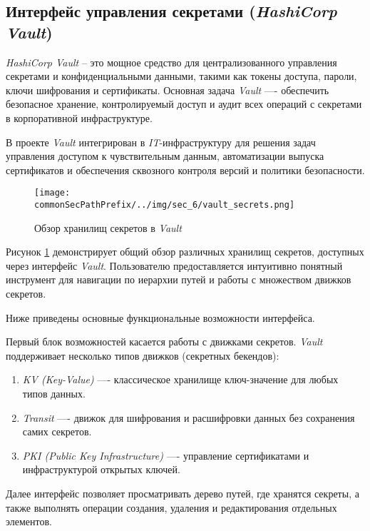\subsection{Интерфейс управления секретами (\textit{HashiCorp Vault})}

\textit{HashiCorp Vault} -- это мощное средство для централизованного управления секретами и конфиденциальными данными, такими как токены доступа, пароли, ключи шифрования и сертификаты. Основная задача \textit{Vault} —- обеспечить безопасное хранение, контролируемый доступ и аудит всех операций с секретами в корпоративной инфраструктуре.

В проекте \textit{Vault} интегрирован в \textit{IT}-инфраструктуру для решения задач управления доступом к чувствительным данным, автоматизации выпуска сертификатов и обеспечения сквозного контроля версий и политики безопасности.

\begin{figure}[ht]
    \centering
    \texttt{[image: \\commonSecPathPrefix/../img/sec\_6/vault\_secrets.png]}
    \caption{Обзор хранилищ секретов в \textit{Vault}}
    \label{fig:user_guide:vault_secrets}
\end{figure}

Рисунок \ref{fig:user_guide:vault_secrets} демонстрирует общий обзор различных хранилищ секретов, доступных через интерфейс \textit{Vault}. Пользователю предоставляется интуитивно понятный инструмент для навигации по иерархии путей и работы с множеством движков секретов.

Ниже приведены основные функциональные возможности интерфейса.

Первый блок возможностей касается работы с движками секретов. \textit{Vault} поддерживает несколько типов движков (секретных бекендов):

\begin{enumerate}
    \item \textit{KV (Key-Value)} —- классическое хранилище ключ-значение для любых типов данных.
    \item \textit{Transit} —- движок для шифрования и расшифровки данных без сохранения самих секретов.
    \item \textit{PKI (Public Key Infrastructure)} —- управление сертификатами и инфраструктурой открытых ключей.
\end{enumerate}

Далее интерфейс позволяет просматривать дерево путей, где хранятся секреты, а также выполнять операции создания, удаления и редактирования отдельных элементов.

